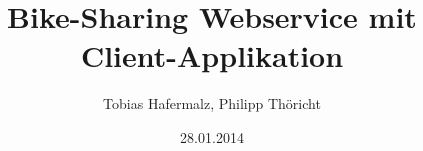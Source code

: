 \author{Tobias Hafermalz, Philipp Thöricht}
\title{Bike-Sharing Webservice mit Client-Applikation}
\date{28.01.2014}
\maketitle
